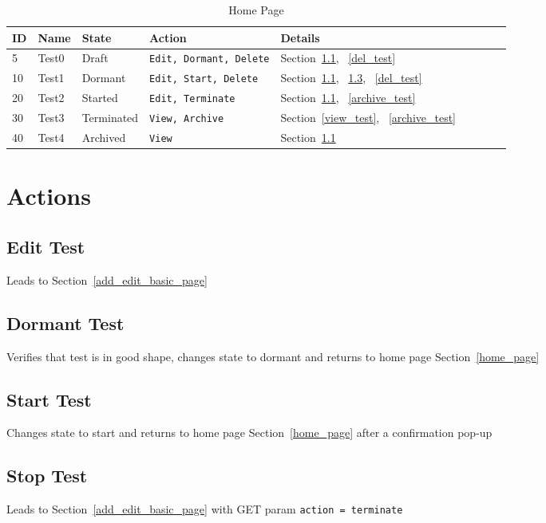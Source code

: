 \documentclass[letterpaper]{article}
\begin{document}
\begin{table}[hb]
\centering
\begin{tabular}{|l||l|l|l|l|l|l|l|l|}  \hline \hline
  {\bf ID} & {\bf Name} & {\bf State} & {\bf Action} & {\bf Details} \\ \hline \hline
  5 & Test0 & Draft & {\tt Edit, Dormant, Delete} & Section~\ref{edit_test},
  ~\ref{del_test} \\ \hline 
  10 & Test1 & Dormant & {\tt Edit, Start, Delete} &  
  Section~\ref{edit_test}, ~\ref{start_test}, ~\ref{del_test} \\ \hline 
  20 & Test2 & Started & {\tt Edit, Terminate} & 
  Section~\ref{edit_test}, ~\ref{archive_test} \\ \hline 
  30 & Test3 & Terminated & {\tt View, Archive} & 
  Section~\ref{view_test}, ~\ref{archive_test} \\ \hline 
  40 & Test4 & Archived & {\tt View}  &  Section~\ref{edit_test} \\ \hline
\hline
\end{tabular}
\caption{Home Page}
\label{tbl_home}
\end{table}


\section{Actions}
\subsection{Edit Test}
\label{edit_test}
Leads to Section~\ref{add_edit_basic_page}

\subsection{Dormant Test}
\label{dormant_test}
Verifies that test is in good shape, changes state to dormant and returns to home page Section~\ref{home_page}

\subsection{Start Test}
\label{start_test}
Changes state to start and returns to home page Section~\ref{home_page} after a
confirmation pop-up

\subsection{Stop Test}
\label{stop_test}
Leads to Section~\ref{add_edit_basic_page} with GET param {\tt action = terminate}
\end{document}
